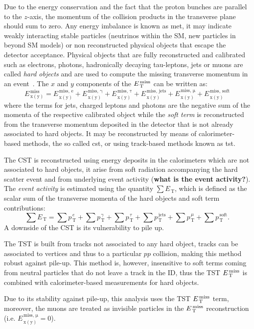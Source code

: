 Due to the energy conservation and the fact that the proton bunches are parallel
to the $z$-axis, the momentum of the collision products in the transverse plane
should sum to zero. Any energy imbalance is known as \gls{met}, it may indicate
weakly interacting stable particles (neutrinos within the SM, new particles in
beyond SM models) or non reconstructed physical objects that escape the detector
acceptance. Physical objects that are fully reconstructed and calibrated such as
electrons, photons, hadronically decaying tau-leptons, jets or muons are called
\emph{hard objects} and are used to compute the missing transverse momentum in
an event~\cite{MET}. The $x$ and $y$ components of the $E_\mathrm{\, T}^\mathrm{\, miss}$ can be written as:
\begin{equation}
  \label{eq:62}
  E_\mathrm{\, x(y)}^\mathrm{\, miss} = E_\mathrm{\, x(y)}^\mathrm{\, miss,\, e} +
  E_\mathrm{\, x(y)}^\mathrm{\, miss,\, \gamma} + E_\mathrm{\, x(y)}^\mathrm{\,
    miss,\, \tau} + E_\mathrm{\, x(y)}^\mathrm{\, miss,\, \text{jets}} +
  E_\mathrm{\, x(y)}^\mathrm{\, miss,\, \mu} + E_\mathrm{\, x(y)}^\mathrm{\, miss,\,
    \text{soft}}
\end{equation}
where the terms for jets, charged leptons and photons are the negative sum of
the momenta of the respective calibrated object while the \emph{soft term} is
reconstructed from the transverse momentum deposited in the detector that is not
already associated to hard objects. It may be reconstructed by means of
calorimeter-based methods, the so called \gls{cst}, or using track-based methods
known as \gls{tst}.

The CST is reconstructed using energy deposits in the calorimeters which are not
associated to hard objects, it arise from soft radiation accompanying the hard
scatter event and from underlying event activity (\textbf{what is the event
  activity?}). The \emph{event activity} is estimated using the quantity
$\sum E_\mathrm{\, T}$, which is defined as the scalar sum of the transverse
momenta of the hard objects and soft term contributions:
\begin{equation}
  \label{eq:63}
  \sum E_{\mathrm{\, T}} = \sum p_{\mathrm{\, T}}^{\, e} + \sum p_{\mathrm{\,
      T}}^{\, \gamma} + \sum p_{\mathrm{\, T}}^{\, \tau} + \sum p_{\mathrm{\,
      T}}^{\, \text{jets}} + \sum p_{\mathrm{\, T}}^{\, \mu} + \sum p_{\mathrm{\,
      T}}^{\, \text{soft}}.
\end{equation}
A downside of the CST is its vulnerability to pile up.

The TST is built from tracks not associated to any hard object, tracks can be
associated to vertices and thus to a particular $pp$ collision, making this
method robust against pile-up. This method is, however, insensitive to soft
terms coming from neutral particles that do not leave a track in the ID, thus
the TST $E_\mathrm{\, T}^\mathrm{\, miss}$ is combined with calorimeter-based measurements for hard objects.

Due to its stability against pile-up, this analysis uses the TST $E_\mathrm{\, T}^\mathrm{\, miss}$ term,
moreover, the muons are treated as invisible particles in the $E_\mathrm{\, T}^\mathrm{\, miss}$
reconstruction (i.e. $E_\mathrm{\, x(y)}^\mathrm{\, miss,\, \mu} = 0$).
